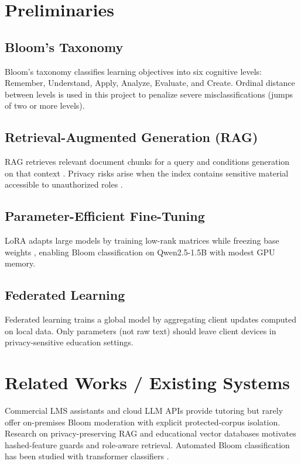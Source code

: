 
\section{Preliminaries}
\subsection{Bloom's Taxonomy}
Bloom's taxonomy classifies learning objectives into six cognitive levels: Remember, Understand, Apply, Analyze, Evaluate, and Create. Ordinal distance between levels is used in this project to penalize severe misclassifications (jumps of two or more levels).

\subsection{Retrieval-Augmented Generation (RAG)}
RAG retrieves relevant document chunks for a query and conditions generation on that context \cite{rag_knowledge_intensive}. Privacy risks arise when the index contains sensitive material accessible to unauthorized roles \cite{good_bad_rag,dp_rag}.

\subsection{Parameter-Efficient Fine-Tuning}
LoRA adapts large models by training low-rank matrices while freezing base weights \cite{qlora}, enabling Bloom classification on Qwen2.5-1.5B with modest GPU memory.

\subsection{Federated Learning}
Federated learning trains a global model by aggregating client updates computed on local data. Only parameters (not raw text) should leave client devices in privacy-sensitive education settings.

\section{Related Works / Existing Systems}
Commercial LMS assistants and cloud LLM APIs provide tutoring but rarely offer on-premises Bloom moderation with explicit protected-corpus isolation. Research on privacy-preserving RAG \cite{dp_rag,remoterag,privtabrag} and educational vector databases \cite{pp_eduvec} motivates hashed-feature guards and role-aware retrieval. Automated Bloom classification has been studied with transformer classifiers \cite{roberta_bloom_assessment}.

